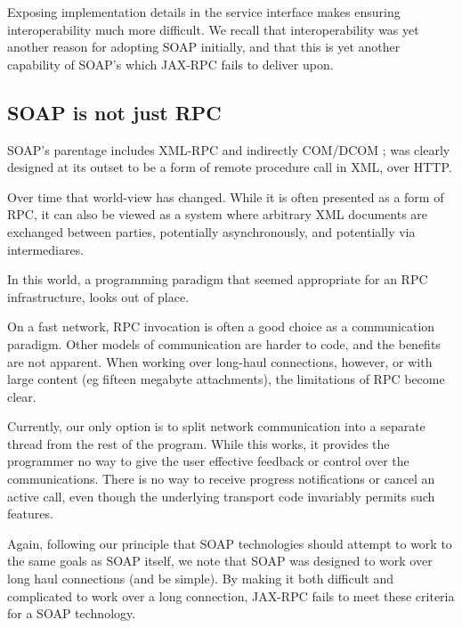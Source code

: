 
Exposing implementation details in the service interface makes ensuring
interoperability much more difficult. We recall that interoperability
was yet another reason for adopting SOAP initially, and that this is yet
another capability of SOAP's which JAX-RPC fails to deliver upon.

\subsection{SOAP is not just RPC}
\label{objections:soap-not-just-rmi}

SOAP's parentage includes XML-RPC \cite{winer:xmlrpc} and indirectly
COM/DCOM \cite{dbox:com};
was clearly designed at its outset to be a form of remote procedure call
in XML, over HTTP.

Over time that world-view has changed. While it is often presented as
a form of RPC, it can also be viewed as a system where arbitrary XML documents
are exchanged between parties, potentially asynchronously, and potentially
via intermediares. 

In this world, a programming paradigm that seemed appropriate for an RPC
infrastructure, looks out of place.


On a fast network, RPC invocation is often a good choice as a
communication paradigm. Other models of communication are harder to
code, and the benefits are not apparent. When working over long-haul
connections, however, or with large content (eg fifteen megabyte
attachments), the limitations of RPC become clear. 

Currently, our only option is to split network communication into a
separate thread from the rest of the program. While this works, it
provides the programmer no way to give the user effective feedback or
control over the communications. There is no way to receive progress
notifications or cancel an active call, even though the underlying
transport code invariably permits such features.

Again, following our principle that SOAP technologies should
attempt to work to the same goals as SOAP itself, we note that SOAP
was designed to work over long haul connections (and be simple). By
making it both difficult and complicated to work over a long
connection, JAX-RPC fails to meet these criteria for a SOAP
technology.


